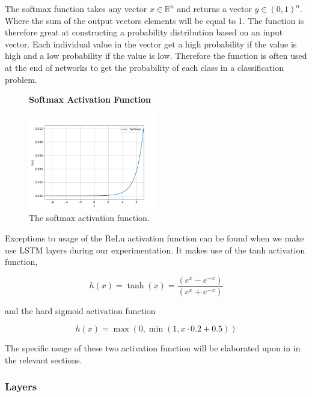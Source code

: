 The softmax function takes any vector $x \in \mathbb{R}^n$ and returns a
vector $y \in (0, 1)^n$. Where the sum of the output vectors elements will
be equal to 1. The function is therefore great at constructing a probability
distribution based on an input vector. Each individual value in the vector get
a high probability if the value is high and a low probability if the value is
low. Therefore the function is often used at the end of networks to get the
probability of each class in a classification problem.

\begin{figure}
    \centering
    \textbf{Softmax Activation Function}\par\medskip
    \includegraphics[width=0.5\textwidth]{./pictures/method/softmax_function.png}
    \caption{The softmax activation function.}
    \label{fig:softmax_activation}
\end{figure}

Exceptions to usage of the \gls{ReLu} activation function can be found when
we make use LSTM layers during our experimentation. It makes use of the
tanh activation function,

\begin{equation}\label{eq:tanh}
h(x) = \tanh(x) = \frac{(e^x - e^{-x})}{(e^x + e^{-x})}
\end{equation}

and the hard sigmoid activation function

\begin{equation}\label{eq:h_sig}
h(x) = \max(0, \min(1, x \cdot 0.2 + 0.5))
\end{equation}

The specific usage of these two activation function will be elaborated upon in 
in the relevant sections.


\subsubsection{Layers} \label{subsubsec:layers}


